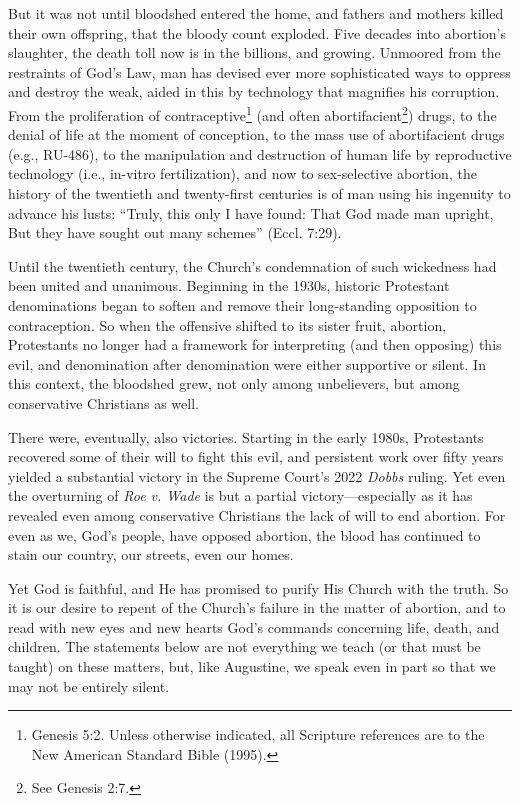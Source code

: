 \documentclass[
]{book}
\begin{document}
But it was not until bloodshed entered the home, and fathers and mothers killed their own offspring, that the bloody count exploded. Five decades into abortion's slaughter, the death toll now is in the billions, and growing. Unmoored from the restraints of God's Law, man has devised ever more sophisticated ways to oppress and destroy the weak, aided in this by technology that magnifies his corruption. From the proliferation of contraceptive\footnote{Genesis 5:2. Unless otherwise indicated, all Scripture references are to the New American Standard Bible (1995).} (and often abortifacient\footnote{See Genesis 2:7.}) drugs, to the denial of life at the moment of conception, to the mass use of abortifacient drugs (e.g., RU-486), to the manipulation and destruction of human life by reproductive technology (i.e., in-vitro fertilization), and now to sex-selective abortion, the history of the twentieth and twenty-first centuries is of man using his ingenuity to advance his lusts: ``Truly, this only I have found: That God made man upright, But they have sought out many schemes'' (Eccl. 7:29).

Until the twentieth century, the Church's condemnation of such wickedness had been united and unanimous. Beginning in the 1930s, historic Protestant denominations began to soften and remove their long-standing opposition to contraception. So when the offensive shifted to its sister fruit, abortion, Protestants no longer had a framework for interpreting (and then opposing) this evil, and denomination after denomination were either supportive or silent. In this context, the bloodshed grew, not only among unbelievers, but among conservative Christians as well.

There were, eventually, also victories. Starting in the early 1980s, Protestants recovered some of their will to fight this evil, and persistent work over fifty years yielded a substantial victory in the Supreme Court's 2022 \emph{Dobbs} ruling. Yet even the overturning of \emph{Roe v. Wade} is but a partial victory---especially as it has revealed even among conservative Christians the lack of will to end abortion. For even as we, God's people, have opposed abortion, the blood has continued to stain our country, our streets, even our homes.

Yet God is faithful, and He has promised to purify His Church with the truth. So it is our desire to repent of the Church's failure in the matter of abortion, and to read with new eyes and new hearts God's commands concerning life, death, and children. The statements below are not everything we teach (or that must be taught) on these matters, but, like Augustine, we speak even in part so that we may not be entirely silent.
\end{document}
